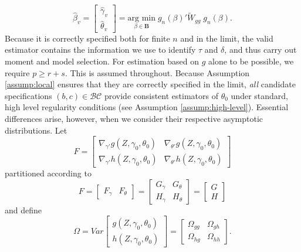 \begin{equation}
  \widehat{\beta}_v =\left[\begin{array}{c}\widehat{\gamma}_{v} \\  \widehat{\theta}_{v} \end{array} \right] =\underset{\beta \in \mathbf{B}}{\mbox{arg min}}\; g_n(\beta)' \widetilde{W}_{gg} \; g_n(\beta).
\end{equation}
Because it is correctly specified both for finite $n$ and in the limit, the valid estimator contains the information we use to identify $\tau$ and $\delta$, and thus carry out moment and model selection. 
For estimation based on $g$ alone to be possible, we require $p \geq r+s$. 
This is assumed throughout.
Because Assumption \ref{assump:local} ensures that they are correctly specified in the limit, \emph{all} candidate specifications $(b,c)\in \mathcal{BC}$ provide consistent estimators of $\theta_0$ under standard, high level regularity conditions (see Assumption \ref{assump:high-level}).
Essential differences arise, however, when we consider their respective asymptotic distributions. 
Let
		\begin{equation}F  =  \left[\begin{array}{cc}  \nabla_{\gamma'}g\left(Z,\gamma_0, \theta_0\right) &   \nabla_{\theta'}g\left(Z,\gamma_0, \theta_0\right) \\
 \nabla_{\gamma'}h\left(Z,\gamma_0, \theta_0\right)  &   \nabla_{\theta'}h\left(Z,\gamma_0, \theta_0\right)  
		 \end{array}\right] 
	\end{equation}
partitioned according to
	\begin{equation}F  = \left[\begin{array}{cc}F_\gamma & F_\theta \end{array}\right] = 
		  \left[\begin{array}{cc} G_\gamma & G_\theta \\
					 H_\gamma& H_\theta
		 \end{array}\right] = \left[\begin{array}{c} G\\ H \end{array}\right]
	\end{equation}
and define
	\begin{equation}
		\Omega = Var\left[ \begin{array}{c} g(Z, \gamma_0, \theta_0) \\ h(Z, \gamma_0, \theta_0) \end{array}\right] =\left[ \begin{array}{cc}\Omega_{gg} & \Omega_{gh}\\ \Omega_{hg}& \Omega_{hh} \end{array} \right].
	\end{equation}
